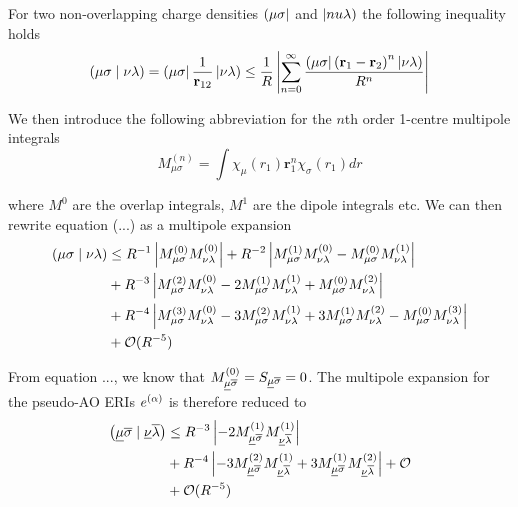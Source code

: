 For two non-overlapping charge densities $\left( \mu\sigma \right\rvert$ and $\left\lvert nu\lambda \right)$ the following inequality holds
\begin{equation}
\left( \mu\sigma \mid \nu\lambda \right) = \left( \mu\sigma \right\rvert\frac{1}{\mathbf{r}_{12}}\left\lvert \nu\lambda \right) \leq \frac{1}{R} \left\lvert \sum_{n=0}^{\infty} \frac{\left( \mu\sigma \right\rvert \left( \mathbf{r}_1 - \mathbf{r}_2 \right)^n \left\lvert \nu\lambda \right)}{R^n} \right\rvert
\end{equation}

\noindent We then introduce the following abbreviation for the $n$th order 1-centre multipole integrals
\begin{equation}
M^{(n)}_{\mu\sigma} = \int \chi_{\mu}(r_1) \mathbf{r}_1^n \chi_{\sigma}(r_1) dr
\end{equation}

\noindent where $M^{0}$ are the overlap integrals, $M^{1}$ are the dipole integrals etc. We can then rewrite equation (...) as a multipole expansion
\newcommand{\mpole}[2]{M_{#1}^{(#2)}}
\begin{equation}
\begin{split}
\cn{\mu\sigma}{\nu\lambda} &\leq R^{-1} \left\lvert \mpole{\mu\sigma}{0} \mpole{\nu\lambda}{0} \right\rvert + R^{-2} \left\lvert \mpole{\mu\sigma}{1} \mpole{\nu\lambda}{0} - \mpole{\mu\sigma}{0} \mpole{\nu\lambda}{1} \right\rvert \\
&+ R^{-3} \left\lvert \mpole{\mu\sigma}{2} \mpole{\nu\lambda}{0} - 2 \mpole{\mu\sigma}{1} \mpole{\nu\lambda}{1} + \mpole{\mu\sigma}{0} \mpole{\nu\lambda}{2}\right\rvert \\
&+ R^{-4} \left\lvert \mpole{\mu\sigma}{3} \mpole{\nu\lambda}{0} - 3\mpole{\mu\sigma}{2} \mpole{\nu\lambda}{1} + 3\mpole{\mu\sigma}{1} \mpole{\nu\lambda}{2} - \mpole{\mu\sigma}{0} \mpole{\nu\lambda}{3}\right\rvert \\
&+ \mathcal{O}(R^{-5})
\end{split}
\end{equation}

From equation ..., we know that $M_{\underline{\mu}\overline{\sigma}}^{(0)} = S_{\underline{\mu}\overline{\sigma}} = 0$. The multipole expansion for the pseudo-AO ERIs $e^{(\alpha)}$ is therefore reduced to
\begin{equation}
\begin{split}
\cn{\ulgm\olgs}{\ulgn\olgl} &\leq R^{-3} \left\lvert - 2 \mpole{\ulgm\olgs}{1} \mpole{\ulgn\olgl}{1} \right\rvert \\
&+ R^{-4} \left\lvert - 3\mpole{\ulgm\olgs}{2} \mpole{\ulgn\olgl}{1} + 3\mpole{\ulgm\olgs}{1} \mpole{\ulgn\olgl}{2} \right\rvert + \mathcal{O} \\
&+ \mathcal{O}(R^{-5})
\end{split}
\end{equation}

